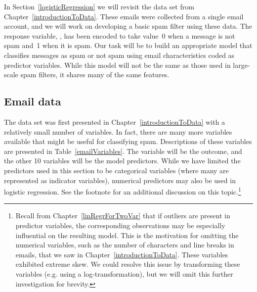 
In Section~\ref{logisticRegression} we will revisit the  data set from Chapter~\ref{introductionToData}. These emails were collected from a single email account, and we will work on developing a basic spam filter using these data. The response variable, , has been encoded to take value~0 when a message is not spam and~1 when it is spam. Our task will be to build an appropriate model that classifies messages as spam or not spam using email characteristics coded as predictor variables. While this model will not be the same as those used in large-scale spam filters, it shares many of the same features. 

\subsection{Email data}

The  data set was first presented in Chapter~\ref{introductionToData} with a relatively small number of variables. In fact, there are many more variables available that might be useful for classifying spam. Descriptions of these variables are presented in Table~\ref{emailVariables}. The  variable will be the outcome, and the other 10 variables will be the model predictors. While we have limited the predictors used in this section to be categorical variables (where many are represented as indicator variables), numerical predictors may also be used in logistic regression. See the footnote for an additional discussion on this topic.\footnote{Recall from Chapter~\ref{linRegrForTwoVar} that if outliers are present in predictor variables, the corresponding observations may be especially influential on the resulting model. This is the motivation for omitting the numerical variables, such as the number of characters and line breaks in emails, that we saw in Chapter~\ref{introductionToData}. These variables exhibited extreme skew. We could resolve this issue by transforming these variables (e.g. using a log-transformation), but we will omit this further investigation for brevity.}

